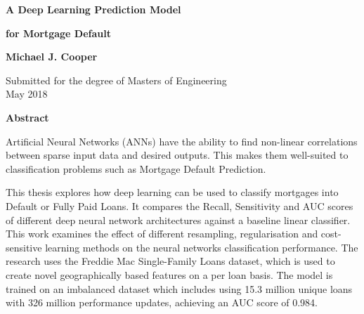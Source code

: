 

\newpage
\thispagestyle{empty}
\begin{center}
  {\Large \bf A Deep Learning Prediction Model}
    \vspace*{0.15cm}
  
  {\Large \bf for Mortgage Default}
  
  \vspace*{2cm}
  \textbf{\large Michael J. Cooper}

  \vspace*{0.5cm}
  {\large Submitted for the degree of Masters of Engineering\\ May 2018}

  \vspace*{4cm}
  \textbf{\large Abstract}
\end{center}
Artificial Neural Networks (ANNs) have the ability to find non-linear correlations between sparse input data and desired outputs. This makes them well-suited to classification problems such as Mortgage Default Prediction. 

This thesis explores how deep learning can be used to classify mortgages into Default or Fully Paid Loans. It compares the Recall, Sensitivity and AUC scores of different deep neural network architectures against a baseline linear classifier. This work examines the effect of different resampling, regularisation and cost-sensitive learning methods on the neural networks classification performance. The research uses the Freddie Mac Single-Family Loans dataset, which is used to create novel geographically based features on a per loan basis. The model is trained on an imbalanced dataset which includes using 15.3 million unique loans with 326 million performance updates, achieving an AUC score of 0.984.


